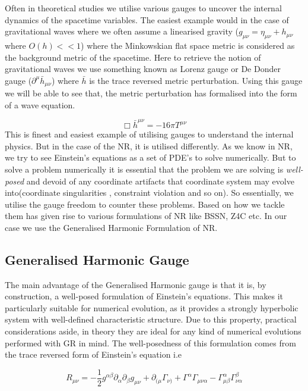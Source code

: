 \documentclass[11pt]{article}
\begin{document}
Often in theoretical studies we utilise various gauges to uncover the internal dynamics of the spacetime variables. The easiest example would in the case of gravitational waves where we often assume a linearised gravity ($g_{\mu\nu}= \eta_{\mu \nu} + h_{\mu \nu}$ where $O(h) << 1$) where the Minkowskian flat space metric is considered as the background metric of the spacetime.  Here to retrieve the notion of gravitational waves we use something known as Lorenz gauge or De Donder gauge ($\partial^{\mu} \bar{h}_{\mu\nu}$) where $\bar{h}$ is the trace reversed metric perturbation. 
Using this gauge we will be able to see that, the metric perturbation has formalised into the form of a wave equation.

$$
\Box \bar{h}^{\mu\nu}= -16 \pi T^{\mu \nu}
$$
This is finest and easiest example of utilising gauges to understand the internal physics. But in the case of the NR, it is utilised differently. As
we know in NR, we try to see Einstein's equations as a set of PDE's to solve numerically. But to solve a problem numerically it is essential that the problem we are solving is \textit{well-posed} and devoid of any coordinate artifacts that coordinate system may evolve into(coordinate singularities , constraint violation and so on). So essentially, we utilise the gauge freedom to counter these problems. Based on how we tackle them has given rise to various formulations of NR like BSSN, Z4C etc. In our case we use the Generalised Harmonic Formulation of NR.

\subsection{Generalised Harmonic Gauge}

The main advantage of the Generalised Harmonic gauge is that it is, by construction, a well-posed formulation of Einstein's equations. This makes it particularly suitable for numerical evolution, as it provides a strongly hyperbolic system with well-defined characteristic structure. Due to this property, practical considerations aside, in theory they are ideal for any kind of numerical evolutions performed with GR in mind.  The well-posedness of this formulation comes from the trace reversed form of Einstein's equation i.e



\begin{equation}
R_{\mu\nu}
= -\frac{1}{2} g^{\alpha\beta} \partial_\alpha \partial_\beta g_{\mu\nu}
+ \partial_{(\mu} \Gamma_{\nu)}
+ \Gamma^\alpha \Gamma_{\mu\nu\alpha}
- \Gamma^\alpha_{\mu\beta} \Gamma^\beta_{\nu\alpha}
\label{GHG}
\end{equation}
\end{document}
